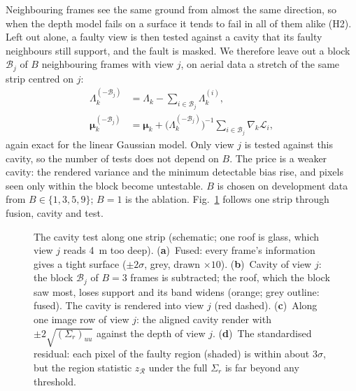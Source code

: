  Neighbouring frames see the same ground from almost the same direction, so when
the depth model fails on a surface it tends to fail in all of them alike (H2). Left out alone, a faulty view
is then tested against a cavity that its faulty neighbours still support, and the fault is masked. We
therefore leave out a block $\mathcal{B}_j$ of $B$ neighbouring frames with view $j$, on aerial data a
stretch of the same strip centred on $j$:
\begin{equation}
  \begin{aligned}
  \Lambda_k^{(-\mathcal{B}_j)}&=\Lambda_k-\textstyle\sum_{i\in\mathcal{B}_j}\Lambda_k^{(i)},\\
  \boldsymbol\mu_k^{(-\mathcal{B}_j)}&=\boldsymbol\mu_k+\bigl(\Lambda_k^{(-\mathcal{B}_j)}\bigr)^{-1}\textstyle\sum_{i\in\mathcal{B}_j}\nabla_k\mathcal{L}_i ,
  \end{aligned}
  \label{eq:block}
\end{equation}
again exact for the linear Gaussian model. Only view $j$ is tested against this cavity, so the number of
tests does not depend on $B$. The price is a weaker cavity: the rendered variance and the minimum
detectable bias rise, and pixels seen only within the block become untestable. $B$ is chosen on
development data from $B\in\{1,3,5,9\}$; $B=1$ is the ablation. Fig.~\ref{fig:cavity} follows one strip
through fusion, cavity and test.

\begin{figure}[!t]
\centering

\caption{The cavity test along one strip (schematic; one roof is glass, which view $j$ reads 4~m too
deep). (\textbf{a})~Fused: every frame's information gives a tight surface ($\pm2\sigma$, grey, drawn
$\times10$). (\textbf{b})~Cavity of view $j$: the block $\mathcal{B}_j$ of $B=3$ frames is subtracted;
the roof, which the block saw most, loses support and its band widens (orange; grey outline: fused). The
cavity is rendered into view $j$ (red dashed). (\textbf{c})~Along one image row of view $j$: the aligned
cavity render with $\pm2\sqrt{(\Sigma_r)_{uu}}$ against the depth of view $j$. (\textbf{d})~The standardised
residual: each pixel of the faulty region (shaded) is within about $3\sigma$, but the region statistic
$z_{\mathcal{R}}$ under the full $\Sigma_r$ is far beyond any threshold.}
\label{fig:cavity}
\end{figure}

